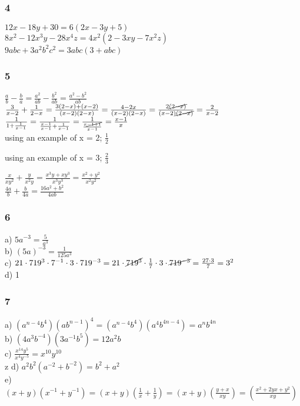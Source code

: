 \documentclass[]{report}
\begin{document}
\subsubsection{4}

$ 12x - 18y + 30 = 6(2x - 3y + 5)$ \\
$ 8x^2 - 12x^3y - 28x^4z = 4x^2(2 - 3xy -7x^2z)$ \\
$ 9abc + 3a^2b^2c^2 = 3abc(3 + abc) $

\subsubsection{5}

$ \frac{a}{b} - \frac{b}{a} = \frac{a^2}{ab} - \frac{b^2}{ab} = \frac{a^2-b^2}{ab} $\\
$\frac{3}{x - 2}  + \frac{1}{2-x} = \frac{3(2-x) + (x-2)}{(x-2)(2-x)} = \frac{4 - 2x}{(x-2)(2-x)} =\frac{2\cancel{(2 - x)}}{(x-2)\cancel{(2-x)}} = \frac{2}{x-2}$\\


$\frac{1}{1 + \frac{1}{x-1}} = \frac{1}{\frac{x-1}{x-1} + \frac{1}{x-1}} = \frac{1}{\frac{x\cancel{-1+1}}{x-1}} = \frac{x-1}{x}$ \\

using an example of x = 2;
$\frac{1}{2} $ 

using an example of x = 3;
$\frac{2}{3} $ 



$\frac{x}{xy^2} + \frac{y}{x^2y} = \frac{x^3y + xy^3}{x^3y^3} = \frac{x^2 + y^2}{x^2y^2}$ \\
$\frac{4a}{b} + \frac{b}{4a} = \frac{16a^2 + b^2}{4ab}$

\subsubsection{6}

a) $5a^{-3}  =  \frac{5}{a^3}$ \\
b) $(5a)^{-3} = \frac{1}{125a^3}$ \\
c) $21 \cdot 719^3 \cdot 7^{-1} \cdot 3 \cdot 719^{-3} = 21 \cdot \cancel{719^3} \cdot \frac{1}{7} \cdot 3 \cdot \cancel{719^{-3}}  = \frac{27 \cdot 3}{7} = 3^2$ \\
d) 1 \\

\subsubsection{7}
a)  $(a^{n-4}b^4)(ab^{n-1})^4 = (a^{n-4}b^4)(a^4b^{4n -4}) = a^nb^{4n}$ \\
b)  $(4a^3b^{-4})(3a^{-1}b^5) = 12a^2b$ \\
c)  $\frac{x^{14}y^5}{x^4y^{-5}} = x^{10}y^{10}$ \\z
d)  $a^2b^2(a^{-2} + b^{-2}) = b^2 + a^2$ \\
e)  $(x+y)(x^{-1} + y^{-1}) =  (x+y)(\frac{1}{x}+\frac{1}{y}) = (x+y)(\frac{y + x}{xy}) = (\frac{x^2 + 2yx + y^2}{xy})$ \\
\end{document}
